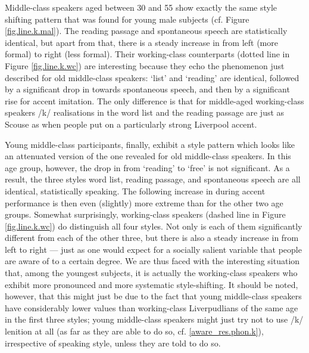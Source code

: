 Middle-class speakers aged between 30 and 55 show exactly the same style shifting pattern that was found for young male subjects (cf. Figure \ref{fig.line.k.mal}).
The reading passage and spontaneous speech are statistically identical, but apart from that, there is a steady increase in  from left (more formal) to right (less formal).
Their working-class counterparts (dotted line in Figure \ref{fig.line.k.wc}) are interesting because they echo the phenomenon just described for old middle-class speakers: `list' and `reading' are identical, followed by a significant drop in  towards spontaneous speech, and then by a significant rise for accent imitation.
The only difference is that for middle-aged working-class speakers /k/ realisations in the word list and the reading passage are just as Scouse as when people put on a particularly strong Liverpool accent.

Young middle-class participants, finally, exhibit a style pattern which looks like an attenuated version of the one revealed for old middle-class speakers.
In this age group, however, the drop in  from `reading' to `free' is not significant.
As a result, the three styles word list, reading passage, and spontaneous speech are all identical, statistically speaking.
The following increase in  during accent performance is then even (slightly) more extreme than for the other two age groups.
Somewhat surprisingly, working-class speakers (dashed line in Figure \ref{fig.line.k.wc}) do distinguish all four styles.
Not only is each of them significantly different from each of the other three, but there is also a steady increase in  from left to right --- just as one would expect for a socially salient variable that people are aware of to a certain degree.
We are thus faced with the interesting situation that, among the youngest subjects, it is actually the working-class speakers who exhibit more pronounced and more systematic style-shifting.
It should be noted, however, that this might just be due to the fact that young middle-class speakers have considerably lower  values than working-class Liverpudlians of the same age in the first three styles; young middle-class speakers might just try not to use /k/ lenition at all (as far as they are able to do so, cf. \ref{aware_res.phon.k}), irrespective of speaking style, unless they are told to do so.